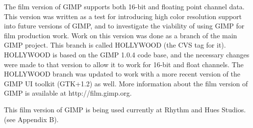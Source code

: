 The film version of GIMP supports both 16-bit and floating point channel data.
This version was written as a test for introducing high color resolution
support into future versions of GIMP, and to investigate the viability of using
GIMP for film production work. Work on this version was done as a branch of the
main GIMP project. This branch is called HOLLYWOOD (the CVS tag for it).
HOLLYWOOD is based on the GIMP 1.0.4 code base, and the necessary changes were
made to that version to allow it to work for 16-bit and float channels. The
HOLLYWOOD branch was updated to work with a more recent version of the GIMP UI 
toolkit (GTK+1.2) as well.  More information about the film version of GIMP is
available at http://film.gimp.org.

This film version of GIMP is being used currently at Rhythm and Hues Studios.
(see Appendix B).

